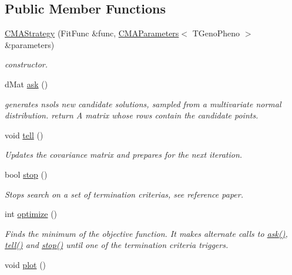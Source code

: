 \subsection*{Public Member Functions}
\begin{DoxyCompactItemize}
\item 
\hyperlink{classlibcmaes_1_1CMAStrategy_a5455e7245be35c169e4144eb666f94f3}{C\-M\-A\-Strategy} (Fit\-Func \&func, \hyperlink{classlibcmaes_1_1CMAParameters}{C\-M\-A\-Parameters}$<$ T\-Geno\-Pheno $>$ \&parameters)
\begin{DoxyCompactList}\small\item\em constructor. \end{DoxyCompactList}\item 
\hypertarget{classlibcmaes_1_1CMAStrategy_ab7266bc50732458ffcab690bc26380e6}{d\-Mat \hyperlink{classlibcmaes_1_1CMAStrategy_ab7266bc50732458ffcab690bc26380e6}{ask} ()}\label{classlibcmaes_1_1CMAStrategy_ab7266bc50732458ffcab690bc26380e6}

\begin{DoxyCompactList}\small\item\em generates nsols new candidate solutions, sampled from a multivariate normal distribution. return A matrix whose rows contain the candidate points. \end{DoxyCompactList}\item 
\hypertarget{classlibcmaes_1_1CMAStrategy_a03d9a4f9338ccd55141323ca309dbdfa}{void \hyperlink{classlibcmaes_1_1CMAStrategy_a03d9a4f9338ccd55141323ca309dbdfa}{tell} ()}\label{classlibcmaes_1_1CMAStrategy_a03d9a4f9338ccd55141323ca309dbdfa}

\begin{DoxyCompactList}\small\item\em Updates the covariance matrix and prepares for the next iteration. \end{DoxyCompactList}\item 
bool \hyperlink{classlibcmaes_1_1CMAStrategy_adc87b9c500959c800b6bc93d89432ecc}{stop} ()
\begin{DoxyCompactList}\small\item\em Stops search on a set of termination criterias, see reference paper. \end{DoxyCompactList}\item 
int \hyperlink{classlibcmaes_1_1CMAStrategy_a68cb0023f51e2824758b1bd1c7512f39}{optimize} ()
\begin{DoxyCompactList}\small\item\em Finds the minimum of the objective function. It makes alternate calls to \hyperlink{classlibcmaes_1_1CMAStrategy_ab7266bc50732458ffcab690bc26380e6}{ask()}, \hyperlink{classlibcmaes_1_1CMAStrategy_a03d9a4f9338ccd55141323ca309dbdfa}{tell()} and \hyperlink{classlibcmaes_1_1CMAStrategy_adc87b9c500959c800b6bc93d89432ecc}{stop()} until one of the termination criteria triggers. \end{DoxyCompactList}\item 
\hypertarget{classlibcmaes_1_1CMAStrategy_a5e56719b620697538d5abe52b5f59b67}{void \hyperlink{classlibcmaes_1_1CMAStrategy_a5e56719b620697538d5abe52b5f59b67}{plot} ()}\label{classlibcmaes_1_1CMAStrategy_a5e56719b620697538d5abe52b5f59b67}


\end{DoxyCompactItemize}
